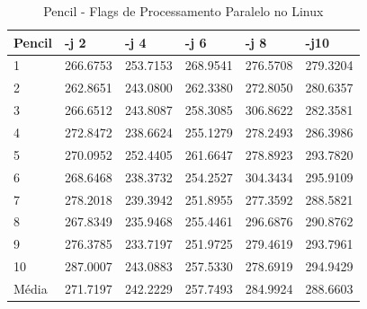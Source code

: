 \begin{table}[!ht]
\centering
\tiny
\caption{Pencil - Flags de Processamento Paralelo no Linux}
\label{tab:flag_processamento_paralelo:linux:pencil}
\begin{tabular}{llllll}
\textbf{Pencil} & \textbf{-j 2} & \textbf{-j 4} & \textbf{-j 6} & \textbf{-j 8} & \textbf{-j10}  \\ \toprule
1                  & 266.6753  &   253.7153   &  268.9541 &    276.5708 &    279.3204       \\ 
2                  & 262.8651  &   243.0800   &  262.3380 &    272.8050 &    280.6357       \\ 
3                  & 266.6512  &   243.8087   &  258.3085 &    306.8622 &    282.3581       \\ 
4                  & 272.8472  &   238.6624   &  255.1279 &    278.2493 &    286.3986       \\ 
5                  & 270.0952  &   252.4405   &  261.6647 &    278.8923 &    293.7820       \\ 
6                  & 268.6468  &   238.3732   &  254.2527 &    304.3434 &    295.9109       \\ 
7                  & 278.2018  &   239.3942   &  251.8955 &    277.3592 &    288.5821       \\ 
8                  & 267.8349  &   235.9468   &  255.4461 &    296.6876 &    290.8762       \\ 
9                  & 276.3785  &   233.7197   &  251.9725 &    279.4619 &    293.7961       \\ 
10                 & 287.0007  &   243.0883   &  257.5330 &    278.6919 &    294.9429       \\ \bottomrule
Média              & 271.7197  &   242.2229   &  257.7493 &    284.9924 &    288.6603       \\ 
\end{tabular}
\end{table}

